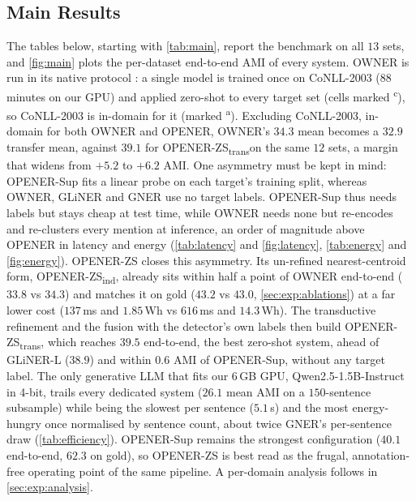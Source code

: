 \documentclass[pdflatex,sn-basic,Numbered]{sn-jnl}
\newcommand{\zstr}{OPENER-ZS\textsubscript{trans}}
\newcommand{\zsind}{OPENER-ZS\textsubscript{ind}}
\begin{document}
\subsection{Main Results}
\label{sec:exp:results}
{
The tables below, starting with \autoref{tab:main}, report the benchmark on all $13$ sets, and \autoref{fig:main} plots the per-dataset end-to-end AMI of every system.
OWNER is run in its native protocol \cite{genest2025owner}: a single model is trained once on CoNLL-2003 ($88$ minutes on our GPU) and applied zero-shot to every target set (cells marked \textsuperscript{c}), so CoNLL-2003 is in-domain for it (marked \textsuperscript{a}).
Excluding CoNLL-2003, in-domain for both OWNER and OPENER, OWNER's $34.3$ mean becomes a $32.9$ transfer mean, against $39.1$ for \zstr on the same $12$ sets, a margin that widens from $+5.2$ to $+6.2$ AMI.
One asymmetry must be kept in mind: OPENER-Sup fits a linear probe on each target's training split, whereas OWNER, GLiNER and GNER use no target labels.
OPENER-Sup thus needs labels but stays cheap at test time, while OWNER needs none but re-encodes and re-clusters every mention at inference, an order of magnitude above OPENER in latency and energy (\autoref{tab:latency} and \autoref{fig:latency}, \autoref{tab:energy} and \autoref{fig:energy}).
OPENER-ZS closes this asymmetry. Its un-refined nearest-centroid form, \zsind, already sits within half a point of OWNER end-to-end ($33.8$ vs $34.3$) and matches it on gold ($43.2$ vs $43.0$, \autoref{sec:exp:ablations}) at a far lower cost ($137$\,ms and $1.85$\,Wh vs $616$\,ms and $14.3$\,Wh).
The transductive refinement and the fusion with the detector's own labels then build \zstr, which reaches $39.5$ end-to-end, the best zero-shot system, ahead of GLiNER-L ($38.9$) and within $0.6$ AMI of OPENER-Sup, without any target label.
The only generative LLM that fits our $6$\,GB GPU, Qwen2.5-1.5B-Instruct \cite{qwen2025} in 4-bit, trails every dedicated system ($26.1$ mean AMI on a $150$-sentence subsample) while being the slowest per sentence ($5.1$\,s) and the most energy-hungry once normalised by sentence count, about twice GNER's per-sentence draw (\autoref{tab:efficiency}).
OPENER-Sup remains the strongest configuration ($40.1$ end-to-end, $62.3$ on gold), so OPENER-ZS is best read as the frugal, annotation-free operating point of the same pipeline.
A per-domain analysis follows in \autoref{sec:exp:analysis}.
\par}
\end{document}
